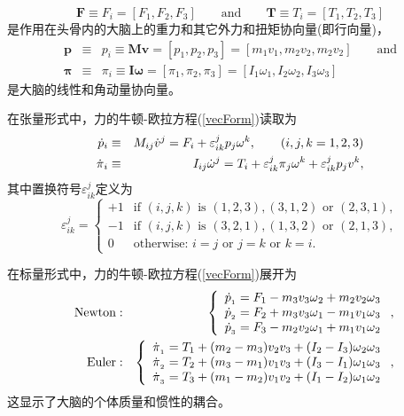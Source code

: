 \documentclass[11pt,fontset=founder]{ctexart}
\begin{document}
\begin{equation*}
\mathbf{F}\equiv F_{i}=[F_{1},F_{2},F_{3}]\qquad \text{and}\qquad \mathbf{T}%
\equiv T_{i}=[T_{1},T_{2},T_{3}]
\end{equation*}
是作用在头骨内的大脑上的重力和其它外力和扭矩协向量(即行向量)，
\begin{eqnarray*}
\mathbf{p} &\equiv &p_{i}\equiv \mathbf{Mv}%
=[p_{1},p_{2},p_{3}]=[m_{1}v_{1},m_{2}v_{2},m_{2}v_{2}]\qquad \text{and} \\
\mathbf{\pi } &\equiv &\pi _{i}\equiv \mathbf{I\omega }=[\pi _{1},\pi
_{2},\pi _{3}]=[I_{1}\omega _{1},I_{2}\omega _{2},I_{3}\omega _{3}]
\end{eqnarray*}
是大脑的线性和角动量协向量。

在张量形式中，力的牛顿-欧拉方程(\ref{vecForm})读取为
\begin{eqnarray*}
\dot{p}_{i} &\equiv &M_{ij}\dot{v}^{j}=F_{i}+\varepsilon _{ik}^{j}p_{j}{%
\omega }^{k},\qquad(i,j,k=1,2,3) \\
\dot{\pi}_{i} &\equiv &I_{ij}\dot{\omega}^{j}=T_{i}+\varepsilon _{ik}^{j}\pi
_{j}\omega ^{k}+\varepsilon _{ik}^{j}p_{j}v^{k},
\end{eqnarray*}
其中置换符号$\varepsilon _{ik}^{j}$定义为
\begin{equation*}
\varepsilon _{ik}^{j}=
\begin{cases}
+1 & \text{if }(i,j,k)\text{ is }(1,2,3),(3,1,2)\text{ or }(2,3,1), \\
-1 & \text{if }(i,j,k)\text{ is }(3,2,1),(1,3,2)\text{ or }(2,1,3), \\
0 & \text{otherwise: }i=j\text{ or }j=k\text{ or }k=i.
\end{cases}
\end{equation*}

在标量形式中，力的牛顿-欧拉方程(\ref{vecForm})展开为
\begin{eqnarray}
\text{Newton} &:&\left\{
\begin{array}{c}
\dot{p}_{_{1}}={F_{1}}-{m_{3}}{v_{3}}{\omega _{2}}+{m_{2}}{v_{2}}{\omega _{3}%
} \\
\dot{p}_{_{2}}={F_{2}}+{m_{3}}{v_{3}}{\omega _{1}}-{m_{1}}{v_{1}}{\omega _{3}%
} \\
\dot{p}_{_{3}}={F_{3}}-{m_{2}}{v_{2}}{\omega _{1}}+{m_{1}}{v_{1}}{\omega _{2}%
}
\end{array}
\right. ,  \label{scalarForm} \\
\text{Euler} &:&\left\{
\begin{array}{c}
\dot{\pi}_{_{1}}={T_{1}}+({m_{2}}-{m_{3}}){v_{2}}{v_{3}}+({I_{2}}-{I_{3}}){%
\omega _{2}}{\omega _{3}} \\
\dot{\pi}_{_{2}}={T_{2}}+({m_{3}}-{m_{1}}){v_{1}}{v_{3}}+({I_{3}}-{I_{1}}){%
\omega _{1}}{\omega _{3}} \\
\dot{\pi}_{_{3}}={T_{3}}+({m_{1}}-{m_{2}}){v_{1}}{v_{2}}+({I_{1}}-{I_{2}}){%
\omega _{1}}{\omega _{2}}
\end{array}
\right. ,  \notag
\end{eqnarray}
这显示了大脑的个体质量和惯性的耦合。
\end{document}

